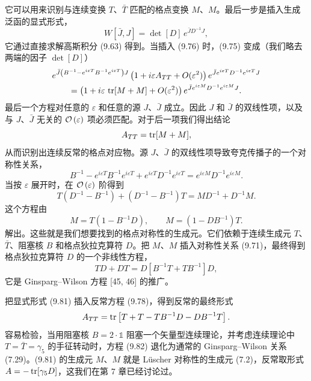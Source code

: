 它可以用来识别与连续变换 $T$、$\bar T$ 匹配的格点变换 $M$、$M$。最后一步是插入生成泛函的显式形式，
\begin{equation}
  W[\bar J,J] = \det[D]\,e^{\bar J D^{-1}J} ,
\end{equation}
它通过直接求解高斯积分 (9.63) 得到。当插入 (9.76) 时，(9.75) 变成（我们略去两端的因子 $\det[D]$）
\begin{multline}
  e^{\bar J\left(B^{-1} - e^{i\varepsilon T}B^{-1}e^{i\varepsilon T}\right)J}
    \left(1 + i\varepsilon A_{TT} + O(\varepsilon^2)\right)
    e^{\bar J e^{i\varepsilon T}D^{-1}e^{i\varepsilon T}J} \\
  = \left(1 + i\varepsilon\,\operatorname{tr}[M + M] + O(\varepsilon^2)\right)
    e^{\bar J e^{i\varepsilon M}D^{-1}e^{i\varepsilon M}J} .
\end{multline}
最后一个方程对任意的 $\varepsilon$ 和任意的源 $J$、$\bar J$ 成立。因此 $J$ 和 $\bar J$ 的双线性项，以及与 $J$、$\bar J$ 无关的 $\mathcal{O}\left(\varepsilon\right)$ 项必须匹配。对于后一项我们得出结论
\begin{equation}
  A_{TT} = \operatorname{tr}[M + M] ,
\end{equation}
从而识别出连续反常的格点对应物。源 $J$、$\bar J$ 的双线性项导致夸克传播子的一个对称性关系，
\begin{equation}
  B^{-1} - e^{i\varepsilon T}B^{-1}e^{i\varepsilon T} + e^{i\varepsilon T}D^{-1}e^{i\varepsilon T}
  = e^{i\varepsilon M}D^{-1}e^{i\varepsilon M} .
\end{equation}
当按 $\varepsilon$ 展开时，在 $\mathcal{O}\left(\varepsilon\right)$ 阶得到
\begin{equation}
  T\left(D^{-1} - B^{-1}\right) + \left(D^{-1} - B^{-1}\right)T
  = M D^{-1} + D^{-1}M .
\end{equation}
这个方程由
\begin{equation}
  M = T\left(1 - B^{-1}D\right) , \qquad
  M = \left(1 - DB^{-1}\right)T .
\end{equation}
解出。这些就是我们想要找到的格点对称性的生成元。它们依赖于连续生成元 $T$、$\bar T$、阻塞核 $B$ 和格点狄拉克算符 $D$。把 $M$、$M$ 插入对称性关系 (9.71)，最终得到格点狄拉克算符 $D$ 的一个非线性方程，
\begin{equation}
  T D + D T = D\left[B^{-1}T + T B^{-1}\right]D ,
\end{equation}
它是 Ginsparg--Wilson 方程 [45, 46] 的推广。

把显式形式 (9.81) 插入反常方程 (9.78)，得到反常的最终形式
\begin{equation}
  A_{TT} = \operatorname{tr}\left[T + T - T B^{-1}D - D B^{-1}T\right] .
\end{equation}
容易检验，当用阻塞核 $B = 2\cdot\mathbb{1}$ 阻塞一个矢量型连续理论，并考虑连续理论中 $T = \bar T = \gamma_5$ 的手征转动时，方程 (9.82) 退化为通常的 Ginsparg--Wilson 关系 (7.29)。(9.81) 的生成元 $M$、$M$ 就是 L\"uscher 对称性的生成元 (7.2)，反常取形式 $A = -\operatorname{tr}[\gamma_5 D]$，这我们在第 7 章已经讨论过。

